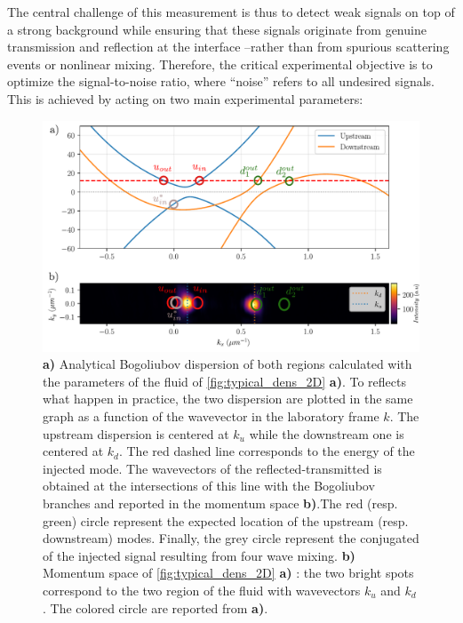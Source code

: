 The central challenge of this measurement is thus to detect weak signals on top of a strong background while ensuring that these signals originate from genuine transmission and reflection at the interface --rather than from spurious scattering events or nonlinear mixing. Therefore, the critical experimental objective is to optimize the signal-to-noise ratio, where “noise” refers to all undesired signals. This is achieved by acting on two main experimental parameters:


\begin{figure}
    \centering
    \includegraphics[width=1\textwidth]{chap_stimulated_hawking/fig/bh_k_space.pdf}
    \caption{\textbf{a)} Analytical Bogoliubov dispersion of both regions calculated with the parameters of the fluid of \autoref{fig:typical_dens_2D} \textbf{a)}. To reflects what happen in practice, the two dispersion are plotted in the same graph as a function of the wavevector in the laboratory frame $k$. The upstream dispersion
    is centered at $k_u$ while the downstream one is centered at $k_d$. The red dashed line corresponds to the energy of the injected mode. The wavevectors of the reflected-transmitted is obtained 
    at the intersections of this line with the Bogoliubov branches and reported in the momentum space \textbf{b)}.The red (resp. green) circle represent the expected location 
    of the upstream (resp. downstream) modes. Finally, the grey circle represent the conjugated of the injected signal resulting from four wave mixing. \textbf{b)} Momentum space of \autoref{fig:typical_dens_2D} \textbf{a)} : the two bright spots correspond to the two region of the fluid with wavevectors $k_u$ and $k_d$. The colored circle
    are reported from \textbf{a)}.}
    \label{fig:bh_k_space}
\end{figure}

